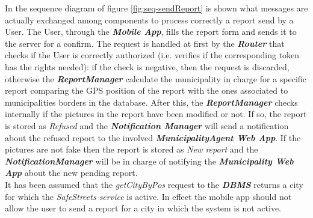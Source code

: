 \documentclass[a4paper]{report}
\begin{document}
In the sequence diagram of figure \ref{fig:seq-sendReport} is shown what messages are actually exchanged among components to process correctly a report send by a User. The User, through the \textit{\textbf{Mobile App}}, fills the report form and sends it to the server for a confirm. The request is handled at first by the \textit{\textbf{Router}} that checks if the User is correctly authorized (i.e. verifies if the corresponding token has the rights needed): if the check is negative, then the request is discarded, otherwise the \textit{\textbf{ReportManager}} calculate the municipality in charge for a specific report comparing the GPS position of the report with the ones associated to municipalities borders in the database. After this, the \textit{\textbf{ReportManager}} checks internally if the pictures in the report have been modified or not. If so, the report is stored as \textit{Refused} and the \textit{\textbf{Notification Manager}} will send a notification about the refused report to the involved \textit{\textbf{MunicipalityAgent Web App}}. If the pictures are not fake then the report is stored as \textit{New report} and the \textit{\textbf{NotificationManager}} will be in charge of notifying the \textit{\textbf{Municipality Web App}} about the new pending report.\\
It has been assumed that the \textit{getCityByPos} request to the \textbf{\textit{DBMS}} returns a city for which the \textit{SafeStreets service} is active. In effect the mobile app should not allow the user to send a report for a city in which the system is not active.
\\\\
\end{document}
